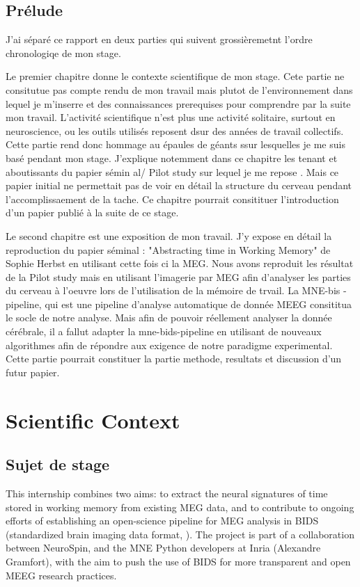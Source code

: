 \section*{Prélude}

J'ai séparé ce rapport en deux parties qui suivent grossièremetnt l'ordre chronologiqe de mon stage.

Le premier chapitre donne le contexte scientifique de mon stage. Cete partie ne consitutue pas compte rendu de mon travail mais plutot de l'environnement dans lequel je m'inserre et des connaissances prerequises pour comprendre par la suite mon travail. L'activité scientifique n'est plus une activité solitaire, surtout en neuroscience, ou les outils utilisés reposent dsur des années de travail collectifs. Cette partie rend donc hommage au épaules de géants ssur lesquelles je me suis basé pendant mon stage. J'explique notemment dans ce chapitre les tenant et aboutissants du papier sémin al/ Pilot study sur lequel je me repose \cite{herbst2021abstracting}. Mais ce papier initial ne permettait pas de voir en détail la structure du cerveau pendant l'accomplissaement de la tache. Ce chapitre pourrait consitituer l'introduction d'un papier publié à la suite de ce stage.

Le second chapitre est une exposition de mon travail. J'y expose en détail la reproduction du papier séminal : "Abstracting time in Working Memory" de Sophie Herbst en utilisant cette fois ci la MEG. Nous avons reproduit les résultat de la Pilot study mais en utilisant l'imagerie par MEG afin d'analyser les parties du cerveau à l'oeuvre lors de l'utilisation de la mémoire de trvail. La MNE-bis -pipeline, qui est une pipeline d'analyse automatique de donnée MEEG consititua le socle de notre analyse. Mais afin de pouvoir réellement analyser la donnée cérébrale, il a fallut adapter la mne-bids-pipeline en utilisant de nouveaux algorithmes afin de répondre aux exigence de notre paradigme experimental. Cette partie pourrait constituer la partie methode, resultats et discussion d'un futur papier.


\chapter{Scientific Context}

\section{Sujet de stage}
This internship combines two aims: to extract the neural signatures of time stored
in working memory from existing MEG data, and to contribute to ongoing efforts of
establishing an open-science pipeline for MEG analysis in BIDS (standardized brain imaging
data format, \cite{gorgolewski2016brain}). The project is part of a collaboration between NeuroSpin, and the MNE
Python developers at Inria (Alexandre Gramfort), with the aim to push the use of BIDS for
more transparent and open MEEG research practices.

